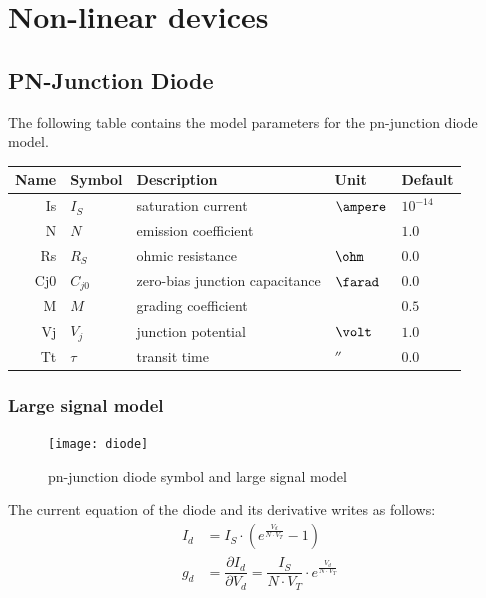 \documentclass[10pt]{report}
\begin{document}
\chapter{Non-linear devices}

\section{PN-Junction Diode}

The following table contains the model parameters for the pn-junction
diode model.

\addvspace{12pt}

\begin{tabular}{rllll}
Name & Symbol & Description & Unit & Default\\
\hline
Is & $I_{S}$ & saturation current & $\ampere$ & $10^{-14}$\\
N & $N$ & emission coefficient & & $1.0$\\
Rs & $R_{S}$ & ohmic resistance & $\ohm$ & $0.0$\\
Cj0 & $C_{j0}$ & zero-bias junction capacitance & $\farad$ & $0.0$\\
M & $M$ & grading coefficient & & $0.5$\\
Vj & $V_{j}$ & junction potential & $\volt$ & $1.0$\\
Tt & $\tau$ & transit time & $\second$ & $0.0$
\end{tabular}

\addvspace{12pt}

\subsection{Large signal model}

\begin{figure}[ht]
\begin{center}
\texttt{[image: diode]}
\end{center}
\caption{pn-junction diode symbol and large signal model}
\label{fig:diode}
\end{figure}
\FloatBarrier

The current equation of the diode and its derivative writes as
follows:
\begin{align}
I_{d} &= I_{S}\cdot \left(e^{\frac{V_{d}}{N\cdot V_{T}}} - 1\right)\\
g_{d} &= \dfrac{\partial I_{d}}{\partial V_{d}} = \dfrac{I_{S}}{N\cdot V_{T}}\cdot e^{\frac{V_{d}}{N\cdot V_{T}}}
\end{align}
\end{document}
